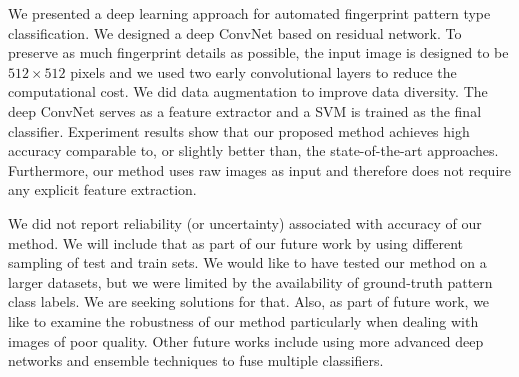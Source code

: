 
We presented a deep learning approach for automated fingerprint pattern type classification. We designed a deep ConvNet based on residual network. To preserve as much fingerprint details as possible, the input image  is designed to be  $512\times512$ pixels and we used two early convolutional layers to reduce the computational cost.  We did data augmentation to improve data diversity.  The deep ConvNet serves as a feature extractor and a SVM is trained as the final classifier. 
Experiment results show that our proposed method achieves high accuracy comparable to, or slightly better than, the state-of-the-art approaches.  Furthermore, our method uses raw images as input and therefore does not require any explicit feature extraction.  

We did not report reliability (or uncertainty) associated with accuracy of our method.  We will include that as part of our future work by using different sampling of test and train sets.  We would like to have tested our method on a larger datasets, but we were limited by the availability of ground-truth pattern class labels.  We are seeking solutions for that.  Also, as part of future work, we like to examine the robustness of our method particularly when dealing with images of poor quality.
Other future works include using more advanced deep networks and ensemble techniques to fuse multiple classifiers.